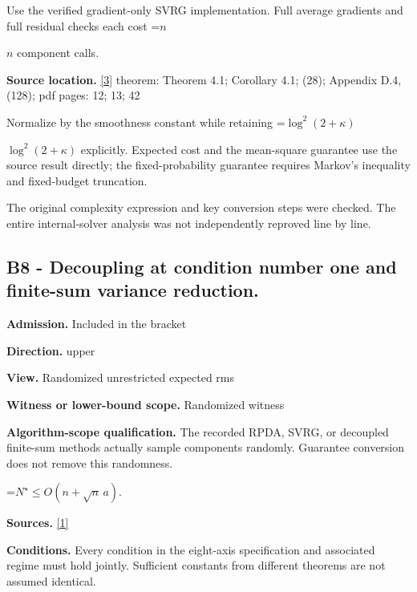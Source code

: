 \documentclass[10pt,a4paper]{article}
\newcommand{\AtlasMath}[1]{\par\begingroup\centering\setbox0=\hbox{$\displaystyle #1$}\ifdim\wd0>1.4\linewidth\typeout{ATLAS WIDE FORMULA: \the\wd0}\fi\ifdim\wd0>\linewidth\resizebox{\linewidth}{!}{\box0}\else\box0\fi\par\endgroup}
\newcommand{\AtlasInlineMath}[1]{\begingroup\setbox0=\hbox{$#1$}\ifdim\wd0>.4\linewidth\endgroup\AtlasMath{#1}\else\endgroup$#1$\fi}
\begin{document}
Use the verified gradient-only SVRG implementation. Full average gradients and full residual checks each cost \AtlasInlineMath{n} component calls.



\textbf{Source location.} \href{https://arxiv.org/pdf/2103.15888v1}{[3]} theorem: Theorem 4.1; Corollary 4.1; (28); Appendix D.4, (128); pdf pages: 12; 13; 42



Normalize by the smoothness constant while retaining \AtlasInlineMath{\log^2(2+\kappa)} explicitly. Expected cost and the mean-square guarantee use the source result directly; the fixed-probability guarantee requires Markov's inequality and fixed-budget truncation.



The original complexity expression and key conversion steps were checked. The entire internal-solver analysis was not independently reproved line by line.



\subsection{B8 - Decoupling at condition number one and finite-sum variance reduction.}


\textbf{Admission.} Included in the bracket



\textbf{Direction.} upper



\textbf{View.} Randomized unrestricted expected rms



\textbf{Witness or lower-bound scope.} Randomized witness



\textbf{Algorithm-scope qualification.} The recorded RPDA, SVRG, or decoupled finite-sum methods actually sample components randomly. Guarantee conversion does not remove this randomness.



\AtlasMath{N^\star\le O(n+\sqrt n\,a).}


\textbf{Sources.} \href{https://arxiv.org/pdf/2610.04944v1}{[1]}



\textbf{Conditions.} Every condition in the eight-axis specification and associated regime must hold jointly. Sufficient constants from different theorems are not assumed identical.
\end{document}
